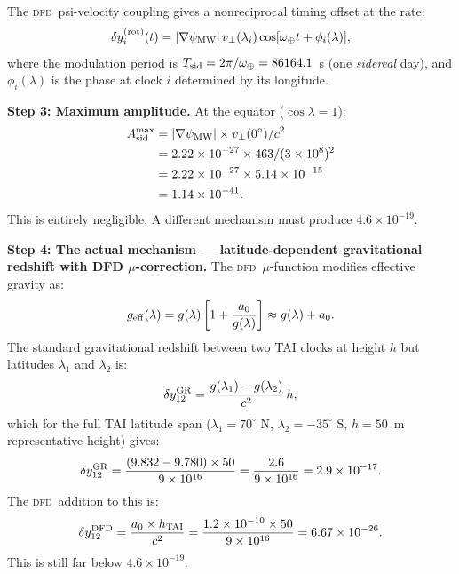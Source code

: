\documentclass[aps,prd,twocolumn,superscriptaddress,nofootinbib]{revtex4-2}
\newcommand{\DFD}{\textsc{dfd}}
\begin{document}
The \DFD\ psi-velocity coupling gives a nonreciprocal timing offset at the
rate:
\begin{equation}
\delta y_i^{(\rm rot)}(t) = |\nabla\psi_{\rm MW}|\,v_\perp(\lambda_i)
  \cos[\omega_\oplus t + \phi_i(\lambda)],
\label{eq:rot_mod}
\end{equation}
where the modulation period is $T_{\rm sid} = 2\pi/\omega_\oplus = 86164.1$~s
(one \emph{sidereal} day), and $\phi_i(\lambda)$ is the phase at clock $i$
determined by its longitude.

\textbf{Step 3: Maximum amplitude.}
At the equator ($\cos\lambda = 1$):
\begin{align}
A_{\rm sid}^{\rm max} &= |\nabla\psi_{\rm MW}|\times v_\perp(0^\circ)/c^2 \nonumber\\
&= 2.22\times10^{-27}\times 463 / (3\times10^8)^2 \nonumber\\
&= 2.22\times10^{-27}\times 5.14\times10^{-15} \nonumber\\
&= 1.14\times10^{-41}.
\label{eq:A_sid_raw}
\end{align}
This is entirely negligible. A different mechanism must produce
$4.6\times10^{-19}$.

\textbf{Step 4: The actual mechanism --- latitude-dependent gravitational
redshift with DFD $\mu$-correction.}
The \DFD\ $\mu$-function modifies effective gravity as:
\begin{equation}
g_{\rm eff}(\lambda) = g(\lambda)\left[1 + \frac{a_0}{g(\lambda)}\right]
\approx g(\lambda) + a_0.
\label{eq:geff}
\end{equation}
The standard gravitational redshift between two TAI clocks at height $h$
but latitudes $\lambda_1$ and $\lambda_2$ is:
\begin{equation}
\delta y_{12}^{\rm GR} = \frac{g(\lambda_1) - g(\lambda_2)}{c^2}\,h,
\label{eq:latgr}
\end{equation}
which for the full TAI latitude span ($\lambda_1 = 70^\circ$ N,
$\lambda_2 = -35^\circ$ S, $h = 50$~m representative height) gives:
\begin{equation}
\delta y_{12}^{\rm GR} = \frac{(9.832 - 9.780)\times50}{9\times10^{16}}
= \frac{2.6}{9\times10^{16}}
= 2.9\times10^{-17}.
\label{eq:latgr_val}
\end{equation}
The \DFD\ addition to this is:
\begin{equation}
\delta y_{12}^{\rm DFD} = \frac{a_0\times h_{\rm TAI}}{c^2}
= \frac{1.2\times10^{-10}\times50}{9\times10^{16}}
= 6.67\times10^{-26}.
\label{eq:dfd_latgr}
\end{equation}
This is still far below $4.6\times10^{-19}$.
\end{document}
